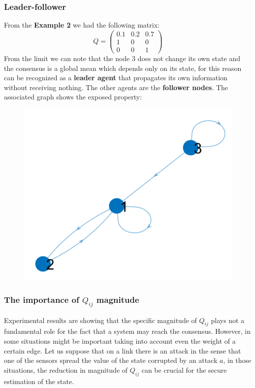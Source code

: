 {\color{blue}\subsubsection{Leader-follower}}
From the \textbf{Example 2} we had the following matrix:
\begin{equation*}
    Q=\begin{pmatrix}
        0.1&0.2&0.7\\1&0&0\\0&0&1
    \end{pmatrix}
\end{equation*}
From the limit we can note that the node 3 does not change its own state and the consensus is a global mean which depends only on its state, for this reason can be recognized as a \textbf{leader agent} that propagates its own information without receiving nothing. The other agents are the \textbf{follower nodes}. The associated graph shows the exposed property:
\begin{figure}[h]
    \centering
    \includegraphics[scale=0.7]{images/Leader_follower.png}
\end{figure}

{\color{blue}\subsubsection{The importance of $Q_{ij}$ magnitude}}
Experimental results are showing that the specific magnitude of  $Q_{ij}$ plays not a fundamental role for the fact that a system may reach the consensus. However, in some situations might be important taking into account even the weight of a certain edge. Let us suppose that on a link there is an attack in the sense that one of the sensors spread the value of the state corrupted by an attack $a$, in those situations, the reduction in magnitude of $Q_{ij}$ can be crucial for the secure estimation of the  state.

